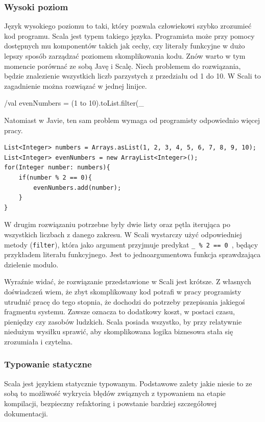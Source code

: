 \documentclass[wimgr]{xmgr}
\begin{document}
\subsubsection{Wysoki poziom}

Język wysokiego poziomu to taki, który pozwala człowiekowi szybko zrozumieć kod programu. Scala jest typem takiego języka. Programista może przy pomocy dostępnych mu komponentów takich jak cechy, czy literały funkcyjne w dużo lepszy sposób zarządzać poziomem skomplikowania kodu. Znów warto w tym momencie porównać ze sobą Javę i Scalę. Niech problemem do rozwiązania, będzie znalezienie wszystkich liczb parzystych z przedziału od 1 do 10. W Scali to zagadnienie można rozwiązać w jednej linijce.

/val evenNumbers = (1 to 10).toList.filter(_ %

Natomiast w Javie, ten sam problem wymaga od programisty odpowiednio więcej pracy.

\begin{verbatim}
List<Integer> numbers = Arrays.asList(1, 2, 3, 4, 5, 6, 7, 8, 9, 10);
List<Integer> evenNumbers = new ArrayList<Integer>();
for(Integer number: numbers){
    if(number % 2 == 0){
        evenNumbers.add(number);
    }
}
\end{verbatim}

W drugim rozwiązaniu potrzebne były dwie listy oraz pętla iterująca po wszystkich liczbach z danego zakresu. W Scali wystarczy użyć odpowiedniej metody (\texttt{filter}), która jako argument przyjmuje predykat \texttt{\_ \% 2 == 0 }, będący przykładem literału funkcyjnego. Jest to jednoargumentowa funkcja sprawdzająca dzielenie modulo.

Wyraźnie widać, że rozwiązanie przedstawione w Scali jest krótsze. Z własnych doświadczeń wiem, że zbyt skomplikowany kod potrafi w pracy programisty utrudnić pracę do tego stopnia, że dochodzi do potrzeby przepisania jakiegoś fragmentu systemu. Zawsze oznacza to dodatkowy koszt, w postaci czasu, pieniędzy czy zasobów ludzkich. Scala posiada wszystko, by przy relatywnie niedużym wysiłku sprawić, aby skomplikowana logika biznesowa stała się zrozumiała i czytelna.

\subsubsection{Typowanie statyczne}

Scala jest językiem statycznie typowanym. Podstawowe zalety jakie niesie to ze sobą to możliwość wykrycia błędów związnych z typowaniem na etapie kompilacji, bezpieczny refaktoring i powstanie bardziej szczegółowej dokumentacji. 
\end{document}
